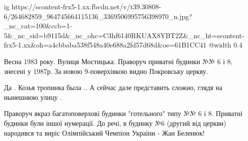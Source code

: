  
 
 
 
 

\ifcmt
  ig https://scontent-frx5-1.xx.fbcdn.net/v/t39.30808-6/264682859_964745664115136_3369506995756398970_n.jpg?_nc_cat=100&ccb=1-5&_nc_sid=b9115d&_nc_ohc=C3hf6140RKUAX8YBT2Z&_nc_ht=scontent-frx5-1.xx&oh=a4cbbaba538f548a40e688a2fd57d68d&oe=61B1CC41
  @width 0.4
\fi


Весна 1983 року. Вулиця Мостицька. Праворуч приватні будинки №№ 6 і 8, знесені
у 1987р. За новою 9-поверхівкою видно Покровську церкву.

Да .
Козья тропинка была ..
А сейчас дале представить сложно, глядя на нынешнюю улицу .


Праворуч якраз багатоповерхові будинки "готельного" типу №№ 6 і 8. Приватні
будинки були іншої нумерації. До речі, в будинку №6 (другий від церкви)
народився та виріс Олімпійський Чемпіон України - Жан Беленюк!
